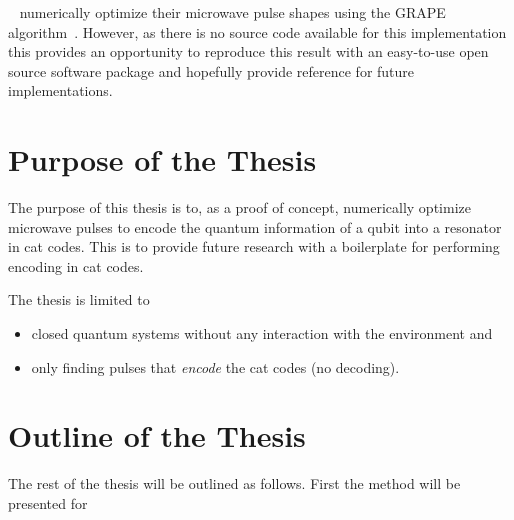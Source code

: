 \documentclass[main.tex]{subfiles}
\begin{document}
~\citeauthor{ofek_extending_2016} numerically optimize their microwave pulse shapes using the GRAPE algorithm~\cite{khaneja_optimal_2005}. However, as there is no source code available for this implementation this provides an opportunity to reproduce this result with an easy-to-use open source software package and hopefully provide reference for future implementations.

\newpage
\section{Purpose of the Thesis}%
\label{sec:purpose}
The purpose of this thesis is to, as a proof of concept, numerically optimize microwave pulses to encode the quantum information of a qubit into a resonator in cat codes.
This is to provide future research with a boilerplate for performing encoding in cat codes.

The thesis is limited to
\begin{itemize}
    \item closed quantum systems without any interaction with the environment and
    \item only finding pulses that \emph{encode} the cat codes (no decoding).
\end{itemize}

\section{Outline of the Thesis}%
\label{sec:outline}
The rest of the thesis will be outlined as follows.
First the method will be presented for
\end{document}
